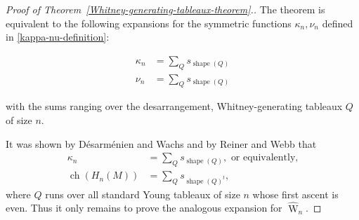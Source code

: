 \documentclass[12pt]{amsart}
\theoremstyle{plain}
\theoremstyle{definition}
\begin{document}
\begin{proof}[Proof of Theorem~\ref{Whitney-generating-tableaux-theorem}.]
The theorem is equivalent to the following expansions for
the symmetric functions $\kappa_n,\nu_n$ defined in \eqref{kappa-nu-definition}:

\begin{align}
\label{desarrangement-symmetric-function-sum}
\kappa_n &=\sum_Q s_{{{\operatorname{shape}}}(Q)} \\
\label{Whitney-generating-symmetric-function-sum}
\nu_n &=\sum_Q s_{{{\operatorname{shape}}}(Q)}
\end{align}

with the sums ranging over the desarrangement, 
Whitney-generating tableaux $Q$ of size $n$.

It was shown by D\'esarm\'enien and Wachs \cite{DesarmenienWachs} and 
by Reiner and Webb \cite[Prop. 2.3]{WebbR} that
\begin{equation}
\label{desarrangement-tableau-model}
\begin{aligned}
\kappa_n&=\sum_Q s_{{{\operatorname{shape}}}(Q)},\text{ or equivalently,}\\
{{\operatorname{ch}}}(H_n(M))&=\sum_Q s_{{{\operatorname{shape}}}(Q)^t},
\end{aligned}
\end{equation}
where $Q$ runs over all standard Young tableaux of size $n$ 
whose first ascent is even.  Thus it only remains to prove the 
analogous expansion for $\widehat{{\operatorname{W}}}_n$.


\end{proof}
\end{document}
